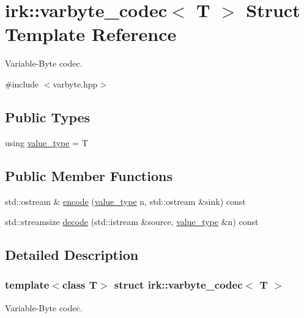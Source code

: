 \hypertarget{structirk_1_1varbyte__codec}{}\section{irk\+:\+:varbyte\+\_\+codec$<$ T $>$ Struct Template Reference}
\label{structirk_1_1varbyte__codec}


Variable-\/\+Byte codec.  




{\ttfamily \#include $<$varbyte.\+hpp$>$}

\subsection*{Public Types}
\begin{DoxyCompactItemize}
\item 
using \mbox{\hyperlink{structirk_1_1varbyte__codec_a362fbaf8b27a38eb23a52a85b1af68ac}{value\+\_\+type}} = T
\end{DoxyCompactItemize}
\subsection*{Public Member Functions}
\begin{DoxyCompactItemize}
\item 
std\+::ostream \& \mbox{\hyperlink{structirk_1_1varbyte__codec_a82d69fd436aa9ea1626ad756cfdb6e88}{encode}} (\mbox{\hyperlink{structirk_1_1varbyte__codec_a362fbaf8b27a38eb23a52a85b1af68ac}{value\+\_\+type}} n, std\+::ostream \&sink) const
\item 
std\+::streamsize \mbox{\hyperlink{structirk_1_1varbyte__codec_aba60747b7941c1f10d104f1cf0778534}{decode}} (std\+::istream \&source, \mbox{\hyperlink{structirk_1_1varbyte__codec_a362fbaf8b27a38eb23a52a85b1af68ac}{value\+\_\+type}} \&n) const
\end{DoxyCompactItemize}


\subsection{Detailed Description}
\subsubsection*{template$<$class T$>$\newline
struct irk\+::varbyte\+\_\+codec$<$ T $>$}

Variable-\/\+Byte codec. 


